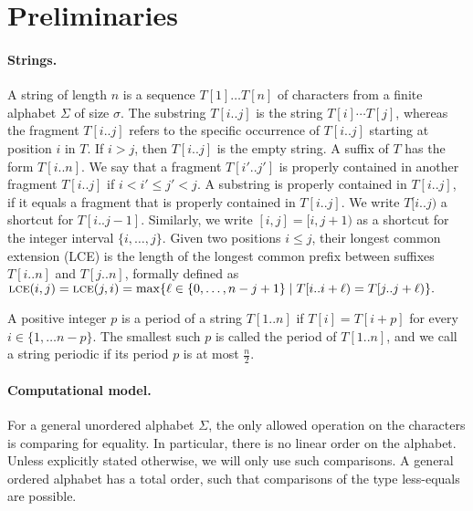 \section{Preliminaries}
\label{sec:prelim}

\paragraph{Strings.}
A string of length $n$ is a sequence $T[1] \dots T[n]$ of characters from a finite alphabet $\Sigma$ of size $\sigma$. The substring $T[i..j]$ is the string $T[i] \cdots T[j]$, whereas the fragment $T[i..j]$ refers to the specific occurrence of $T[i..j]$ starting at position $i$ in $T$. If $i > j$, then $T[i..j]$ is the empty string.
A suffix of $T$ has the form $T[i..n]$.
We say that a fragment $T[i'..j']$ is properly contained in another fragment $T[i..j]$ if $i < i' \leq j' < j$.
A substring is properly contained in $T[i..j]$, if it equals a fragment that is properly contained in $T[i..j]$.
We write $T[i..j)$ a shortcut for $T[i..j-1]$. Similarly, we write $[i, j] = [i, j + 1)$ as a shortcut for the integer interval $\{i, \dots, j\}$. Given two positions $i \leq j$, their longest common extension (LCE) is the length of the longest common prefix between suffixes $T[i..n]$ and $T[j..n]$, formally defined as $\textnormal{\textsc{lce}}(i,j) = \textnormal{\textsc{lce}}(j,i) = \max\{\ell \in \{0, \dots, n - j + 1\} \mid T[i..i+\ell) = T[j..j+\ell)\}.$

\begin{definition}
A positive integer $p$ is a period of a string $T[1 .. n]$ if $T[i] = T[i+p]$ for every $i\in \{1, \dots n-p \}$. The smallest such $p$ is called the period of $T[1..n]$, and we call a string periodic if its period $p$ is at most $\frac{n}{2}$.
\end{definition}

\paragraph{Computational model.}
For a general unordered alphabet $\Sigma$, the only allowed operation on the characters is comparing for equality. In particular, there is no
linear order on the alphabet. Unless explicitly stated otherwise, we will only use such comparisons. A general ordered alphabet has a total order, such that comparisons of the type less-equals are possible. 

